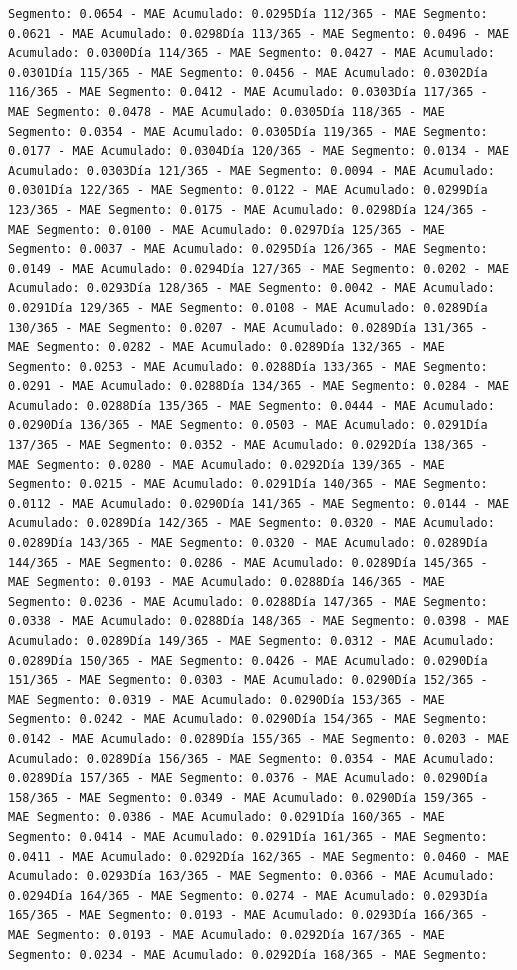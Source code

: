 \documentclass[
]{book}
\begin{document}
\begin{verbatim}
Segmento: 0.0654 - MAE Acumulado: 0.0295Día 112/365 - MAE Segmento: 0.0621 - MAE Acumulado: 0.0298Día 113/365 - MAE Segmento: 0.0496 - MAE Acumulado: 0.0300Día 114/365 - MAE Segmento: 0.0427 - MAE Acumulado: 0.0301Día 115/365 - MAE Segmento: 0.0456 - MAE Acumulado: 0.0302Día 116/365 - MAE Segmento: 0.0412 - MAE Acumulado: 0.0303Día 117/365 - MAE Segmento: 0.0478 - MAE Acumulado: 0.0305Día 118/365 - MAE Segmento: 0.0354 - MAE Acumulado: 0.0305Día 119/365 - MAE Segmento: 0.0177 - MAE Acumulado: 0.0304Día 120/365 - MAE Segmento: 0.0134 - MAE Acumulado: 0.0303Día 121/365 - MAE Segmento: 0.0094 - MAE Acumulado: 0.0301Día 122/365 - MAE Segmento: 0.0122 - MAE Acumulado: 0.0299Día 123/365 - MAE Segmento: 0.0175 - MAE Acumulado: 0.0298Día 124/365 - MAE Segmento: 0.0100 - MAE Acumulado: 0.0297Día 125/365 - MAE Segmento: 0.0037 - MAE Acumulado: 0.0295Día 126/365 - MAE Segmento: 0.0149 - MAE Acumulado: 0.0294Día 127/365 - MAE Segmento: 0.0202 - MAE Acumulado: 0.0293Día 128/365 - MAE Segmento: 0.0042 - MAE Acumulado: 0.0291Día 129/365 - MAE Segmento: 0.0108 - MAE Acumulado: 0.0289Día 130/365 - MAE Segmento: 0.0207 - MAE Acumulado: 0.0289Día 131/365 - MAE Segmento: 0.0282 - MAE Acumulado: 0.0289Día 132/365 - MAE Segmento: 0.0253 - MAE Acumulado: 0.0288Día 133/365 - MAE Segmento: 0.0291 - MAE Acumulado: 0.0288Día 134/365 - MAE Segmento: 0.0284 - MAE Acumulado: 0.0288Día 135/365 - MAE Segmento: 0.0444 - MAE Acumulado: 0.0290Día 136/365 - MAE Segmento: 0.0503 - MAE Acumulado: 0.0291Día 137/365 - MAE Segmento: 0.0352 - MAE Acumulado: 0.0292Día 138/365 - MAE Segmento: 0.0280 - MAE Acumulado: 0.0292Día 139/365 - MAE Segmento: 0.0215 - MAE Acumulado: 0.0291Día 140/365 - MAE Segmento: 0.0112 - MAE Acumulado: 0.0290Día 141/365 - MAE Segmento: 0.0144 - MAE Acumulado: 0.0289Día 142/365 - MAE Segmento: 0.0320 - MAE Acumulado: 0.0289Día 143/365 - MAE Segmento: 0.0320 - MAE Acumulado: 0.0289Día 144/365 - MAE Segmento: 0.0286 - MAE Acumulado: 0.0289Día 145/365 - MAE Segmento: 0.0193 - MAE Acumulado: 0.0288Día 146/365 - MAE Segmento: 0.0236 - MAE Acumulado: 0.0288Día 147/365 - MAE Segmento: 0.0338 - MAE Acumulado: 0.0288Día 148/365 - MAE Segmento: 0.0398 - MAE Acumulado: 0.0289Día 149/365 - MAE Segmento: 0.0312 - MAE Acumulado: 0.0289Día 150/365 - MAE Segmento: 0.0426 - MAE Acumulado: 0.0290Día 151/365 - MAE Segmento: 0.0303 - MAE Acumulado: 0.0290Día 152/365 - MAE Segmento: 0.0319 - MAE Acumulado: 0.0290Día 153/365 - MAE Segmento: 0.0242 - MAE Acumulado: 0.0290Día 154/365 - MAE Segmento: 0.0142 - MAE Acumulado: 0.0289Día 155/365 - MAE Segmento: 0.0203 - MAE Acumulado: 0.0289Día 156/365 - MAE Segmento: 0.0354 - MAE Acumulado: 0.0289Día 157/365 - MAE Segmento: 0.0376 - MAE Acumulado: 0.0290Día 158/365 - MAE Segmento: 0.0349 - MAE Acumulado: 0.0290Día 159/365 - MAE Segmento: 0.0386 - MAE Acumulado: 0.0291Día 160/365 - MAE Segmento: 0.0414 - MAE Acumulado: 0.0291Día 161/365 - MAE Segmento: 0.0411 - MAE Acumulado: 0.0292Día 162/365 - MAE Segmento: 0.0460 - MAE Acumulado: 0.0293Día 163/365 - MAE Segmento: 0.0366 - MAE Acumulado: 0.0294Día 164/365 - MAE Segmento: 0.0274 - MAE Acumulado: 0.0293Día 165/365 - MAE Segmento: 0.0193 - MAE Acumulado: 0.0293Día 166/365 - MAE Segmento: 0.0193 - MAE Acumulado: 0.0292Día 167/365 - MAE Segmento: 0.0234 - MAE Acumulado: 0.0292Día 168/365 - MAE Segmento: 
\end{verbatim}
\end{document}
